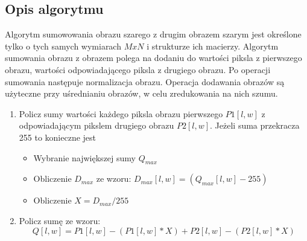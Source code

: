 \documentclass[a4paper,12pt, titlepage]{report}
\begin{document}
\subsection*{Opis algorytmu}
\par Algorytm sumowowania obrazu szarego z drugim obrazem szarym jest określone tylko o tych samych wymiarach \(MxN\) i strukturze ich macierzy. Algorytm sumowania obrazu z obrazem polega na dodaniu do wartości piksla z  pierwszego obrazu, wartości odpowiadającego piksla z drugiego obrazu. Po operacji sumowania następuje normalizacja obrazu. Operacja dodawania obrazów są użyteczne przy uśrednianiu obrazów, w celu zredukowania na nich szumu.
\begin{enumerate}
\item Policz sumy wartości każdego piksla obrazu pierwszego \(P1[l,w]\) z odpowiadającym pikslem drugiego obrazu \(P2[l,w]\). Jeżeli suma przekracza 255 to konieczne jest
\begin{itemize}
\item Wybranie największej sumy \(Q_{max}\) 
\item Obliczenie \(D_{max}\) ze wzoru: \(D_{max}[l,w]=(Q_{max}[l,w]-255)\)
\item Obliczenie \(X=D_{max}/255\)
\end{itemize}
\item Policz sumę ze wzoru: \[Q[l,w]=P1[l,w]-(P1[l,w]*X)+P2[l,w]-(P2[l,w]*X)\]
\end{enumerate}
\end{document}
